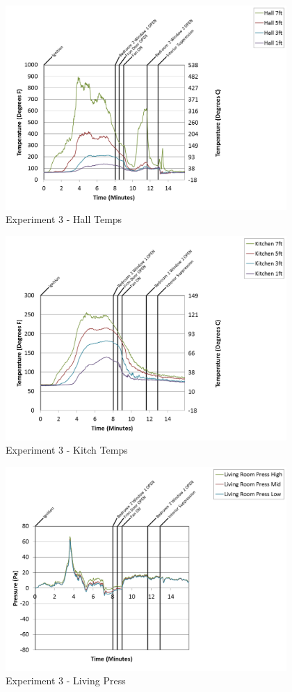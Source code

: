 \documentclass{article}
\begin{document}
\begin{appendices}
\clearpage

\begin{figure}[h!]
	\centering
	\includegraphics[height=3.05in]{0_Images/Results_Charts/Exp_3_Charts/HallTemps.png}
	\caption{Experiment 3 - Hall Temps}
\end{figure}


\begin{figure}[h!]
	\centering
	\includegraphics[height=3.05in]{0_Images/Results_Charts/Exp_3_Charts/KitchTemps.png}
	\caption{Experiment 3 - Kitch Temps}
\end{figure}

\clearpage

\begin{figure}[h!]
	\centering
	\includegraphics[height=3.05in]{0_Images/Results_Charts/Exp_3_Charts/LivingPress.png}
	\caption{Experiment 3 - Living Press}
\end{figure}



\end{appendices}
\end{document}
